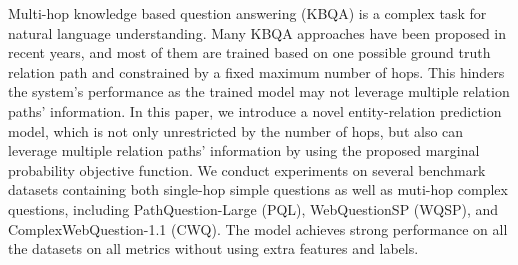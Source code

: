 Multi-hop knowledge based question answering (KBQA) is a complex task for natural language understanding. Many KBQA approaches have been proposed in recent years, and most of them are trained based on one possible ground truth relation path and constrained by a fixed maximum number of hops. This hinders the system's performance as the trained model may not leverage multiple relation paths' information. In this paper, we introduce a novel entity-relation prediction model, which is not only unrestricted by the number of hops, but also can leverage multiple relation paths' information by using the proposed marginal probability objective function. We conduct experiments on several benchmark datasets containing both single-hop simple questions as well as muti-hop complex questions, including PathQuestion-Large (PQL), WebQuestionSP (WQSP), and ComplexWebQuestion-1.1 (CWQ). The model achieves strong performance on all the datasets on all metrics without using extra features and labels.